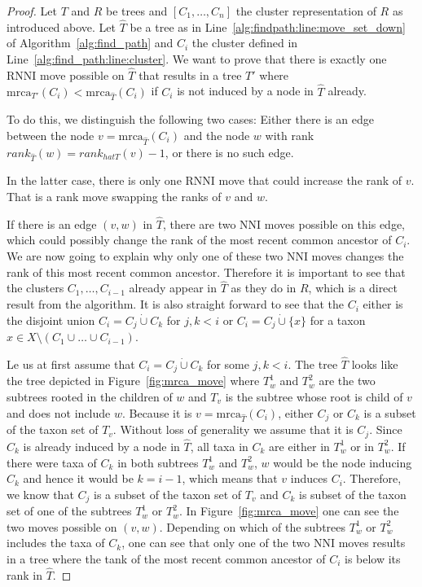 \documentclass{amsart}
\newcommand{\mrca}{\mathrm{mrca}}
\newcommand{\nni}{\mathrm{NNI}}
\newcommand{\rnni}{\mathrm{RNNI}}
\begin{document}
\begin{proof}


    Let $T$ and $R$ be trees and $[C_1, \ldots, C_n]$ the cluster representation
    of $R$ as introduced above.
    Let $\hat T$ be a tree as in Line~\ref{alg:findpath:line:move_set_down} of Algorithm~\ref{alg:find_path} and $C_i$ the cluster defined in Line~\ref{alg:find_path:line:cluster}.
    We want to prove that there is exactly one $\rnni$ move possible on $\hat T$ that results in a tree $T'$ where $\mrca_{T'}(C_i) < \mrca_{\hat T}(C_i)$ if $C_i$ is not induced by a node in $\hat T$ already.

    To do this, we distinguish the following two cases:
    Either there is an edge between the node $v = \mrca_{\hat T}(C_i)$ and the node $w$ with rank $rank_{\hat T}(w) = rank_{hat T}(v) - 1$, or there is no such edge.

    In the latter case, there is only one $\rnni$ move that could increase the rank of $v$.
    That is a rank move swapping the ranks of $v$ and $w$.

    If there is an edge $(v,w)$ in $\hat T$, there are two $\nni$ moves possible on this edge, which could possibly change the rank of the most recent common ancestor of $C_i$.
    We are now going to explain why only one of these two $\nni$ moves changes the rank of this most recent common ancestor.
    Therefore it is important to see that the clusters $C_1, \ldots, C_{i-1}$ already appear in $\hat T$ as they do in $R$, which is a direct result from the algorithm.
    It is also straight forward to see
    that the $C_i$ either is the disjoint union $C_i = C_j \dot\cup C_k$ for $j,k < i$ or $C_i = C_j \dot\cup \{x\}$ for a taxon $x \in X \setminus (C_1 \cup \ldots \cup C_{i-1})$.

    Le us at first assume that $C_i = C_j \dot\cup C_k$ for some $j,k < i$.
    The tree $\hat T$ looks like the tree depicted in Figure~\ref{fig:mrca_move} where $T_w^1$ and $T_w^2$ are the two subtrees rooted in the children of $w$ and $T_v$ is the subtree whose root is child of $v$ and does not include $w$.
    Because it is $v = \mrca_{\hat T}(C_i)$, either $C_j$ or $C_k$ is a subset of the taxon set of $T_v$.
    Without loss of generality we assume that it is $C_j$.
    Since $C_k$ is already induced by a node in $\hat T$, all taxa in $C_k$ are either in $T_w^1$ or in $T_w^2$.
    If there were taxa of $C_k$ in both subtrees $T_w^1$ and $T_w^2$, $w$ would be the node inducing $C_k$ and hence it would be $k = i-1$, which means that $v$ induces $C_i$.
    Therefore, we know that $C_j$ is a subset of the taxon set of $T_v$ and $C_k$ is subset of the taxon set of one of the subtrees $T_w^1$ or $T_w^2$.
    In Figure~\ref{fig:mrca_move} one can see the two moves possible on $(v,w)$.
    Depending on which of the subtrees $T_w^1$ or $T_w^2$ includes the taxa of $C_k$, one can see that only one of the two $\nni$ moves results in a tree where the tank of the most recent common ancestor of $C_i$ is below its rank in $\hat T$.


\end{proof}
\end{document}
